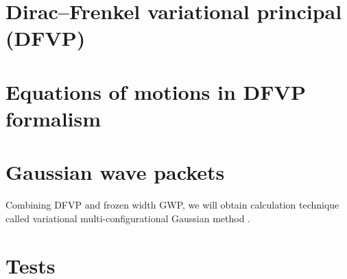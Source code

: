 \documentclass[a4paper,14pt]{extarticle}
\begin{document}
\section{Dirac--Frenkel variational principal (DFVP)}




\section{Equations of motions in DFVP formalism}



\section{Gaussian wave packets}



Combining DFVP and frozen width GWP, we will obtain calculation technique called variational multi-configurational Gaussian method \cite{vmcg}.

\section{Tests}




\end{document}
